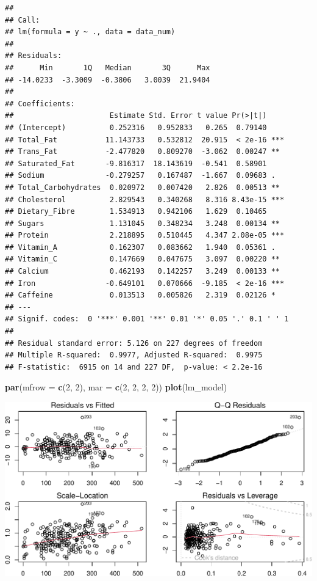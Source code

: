 \documentclass[
]{article}
\newenvironment{Shaded}{\begin{snugshade}}{\end{snugshade}}
\newcommand{\AttributeTok}[1]{\textcolor[rgb]{0.13,0.29,0.53}{#1}}
\newcommand{\DecValTok}[1]{\textcolor[rgb]{0.00,0.00,0.81}{#1}}
\newcommand{\FunctionTok}[1]{\textcolor[rgb]{0.13,0.29,0.53}{\textbf{#1}}}
\newcommand{\NormalTok}[1]{#1}
\begin{document}
\begin{verbatim}
## 
## Call:
## lm(formula = y ~ ., data = data_num)
## 
## Residuals:
##      Min       1Q   Median       3Q      Max 
## -14.0233  -3.3009  -0.3806   3.0039  21.9404 
## 
## Coefficients:
##                      Estimate Std. Error t value Pr(>|t|)    
## (Intercept)          0.252316   0.952833   0.265  0.79140    
## Total_Fat           11.143733   0.532812  20.915  < 2e-16 ***
## Trans_Fat           -2.477820   0.809270  -3.062  0.00247 ** 
## Saturated_Fat       -9.816317  18.143619  -0.541  0.58901    
## Sodium              -0.279257   0.167487  -1.667  0.09683 .  
## Total_Carbohydrates  0.020972   0.007420   2.826  0.00513 ** 
## Cholesterol          2.829543   0.340268   8.316 8.43e-15 ***
## Dietary_Fibre        1.534913   0.942106   1.629  0.10465    
## Sugars               1.131045   0.348234   3.248  0.00134 ** 
## Protein              2.218895   0.510445   4.347 2.08e-05 ***
## Vitamin_A            0.162307   0.083662   1.940  0.05361 .  
## Vitamin_C            0.147669   0.047675   3.097  0.00220 ** 
## Calcium              0.462193   0.142257   3.249  0.00133 ** 
## Iron                -0.649101   0.070666  -9.185  < 2e-16 ***
## Caffeine             0.013513   0.005826   2.319  0.02126 *  
## ---
## Signif. codes:  0 '***' 0.001 '**' 0.01 '*' 0.05 '.' 0.1 ' ' 1
## 
## Residual standard error: 5.126 on 227 degrees of freedom
## Multiple R-squared:  0.9977, Adjusted R-squared:  0.9975 
## F-statistic:  6915 on 14 and 227 DF,  p-value: < 2.2e-16
\end{verbatim}

\begin{Shaded}
\begin{Highlighting}[]
\FunctionTok{par}\NormalTok{(}\AttributeTok{mfrow =} \FunctionTok{c}\NormalTok{(}\DecValTok{2}\NormalTok{, }\DecValTok{2}\NormalTok{), }\AttributeTok{mar =} \FunctionTok{c}\NormalTok{(}\DecValTok{2}\NormalTok{, }\DecValTok{2}\NormalTok{, }\DecValTok{2}\NormalTok{, }\DecValTok{2}\NormalTok{))}
\FunctionTok{plot}\NormalTok{(lm\_model)}
\end{Highlighting}
\end{Shaded}

\begin{center}\includegraphics{Statistical_Learning_Final_Report_files/figure-latex/linear_regression-1} \end{center}
\end{document}
